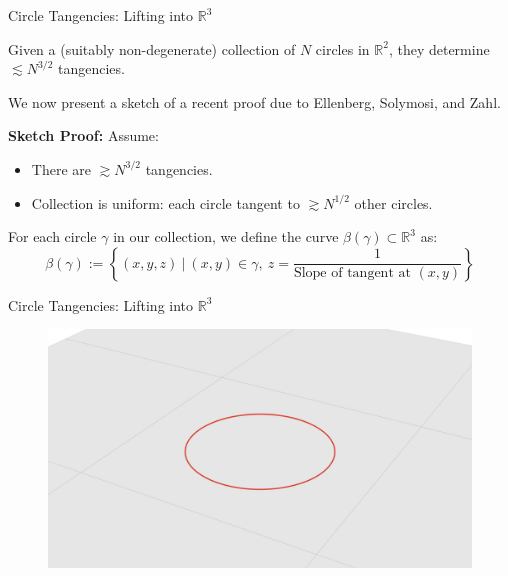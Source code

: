 \documentclass{beamer}
\newcommand{\RR}{\mathbb R}
\newcommand{\nfr}[1]{\begin{frame} #1
\end{frame}}
\begin{document}
\nfr{{Circle Tangencies: Lifting into $\RR^3$}
\begin{theorem}
    Given a (suitably non-degenerate) collection of $N$ circles in $\RR^2$, they determine $\lesssim N^{3/2}$ tangencies.
\end{theorem}
We now present a sketch of a recent proof due to Ellenberg, Solymosi, and Zahl. \cite{ellenberg2016new} \pause

\textbf{Sketch Proof:}
Assume:
\begin{itemize}
    \item There are $\gtrsim N^{3/2}$ tangencies.
    \item Collection is uniform: each circle tangent to $\gtrsim N^{1/2}$ other circles.
\end{itemize}
For each circle $\gamma$ in our collection, we define the curve $\beta(\gamma) \subset \RR^3$ as: \[\beta(\gamma) := \left\{(x,y,z) \ | \ (x,y) \in \gamma,\ z = \frac{1}{\text{Slope of tangent at }(x,y)} \right\}
\]


}

\nfr{{Circle Tangencies: Lifting into $\RR^3$}

\begin{figure}[h]
    \centering
    \includegraphics[width=0.8
    \textwidth, trim={5cm 0 4cm 2cm}, clip=true]{images/Diagram3a.png}
\end{figure}
}
\end{document}
